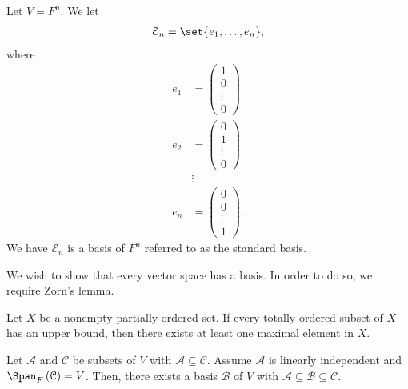 \documentclass[10pt]{mypackage}
\begin{document}
\begin{example}
Let $V = F^n$. We let
\begin{align*}
  \mathcal{E}_n = \set{e_1,\dots,e_n},
\end{align*}
where
\begin{align*}
  e_1 &= \begin{pmatrix}1\\0\\\vdots\\0\end{pmatrix}\\
  e_2 &= \begin{pmatrix}0\\1\\\vdots\\0\end{pmatrix}\\
      &\vdots\\
  e_n &= \begin{pmatrix}0\\0\\\vdots\\1\end{pmatrix}.
\end{align*}
We have $\mathcal{E}_n$ is a basis of $F^n$ referred to as the standard basis.
\end{example}
We wish to show that every vector space has a basis. In order to do so, we require Zorn's lemma.
\begin{theorem}
  Let $X$ be a nonempty partially ordered set. If every totally ordered subset of $X$ has an upper bound, then there exists at least one maximal element in $X$.
\end{theorem}
\begin{theorem}
  Let $\mathcal{A}$ and $\mathcal{C}$ be subsets of $V$ with $\mathcal{A}\subseteq \mathcal{C}$. Assume $\mathcal{A}$ is linearly independent and $\Span_{F}\left(\mathcal{C}\right) = V$. Then, there exists a basis $\mathcal{B}$ of $V$ with $\mathcal{A}\subseteq \mathcal{B}\subseteq \mathcal{C}$.
\end{theorem}
\end{document}
